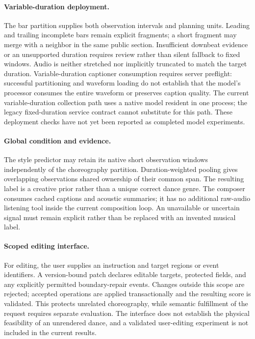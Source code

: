 \paragraph{Variable-duration deployment.}
The bar partition supplies both observation intervals and planning units.
Leading and trailing incomplete bars remain explicit fragments; a short
fragment may merge with a neighbor in the same public section.
Insufficient downbeat evidence or an unsupported duration requires
review rather than silent fallback to fixed windows. Audio is neither
stretched nor implicitly truncated to match the target duration.
Variable-duration captioner consumption requires server preflight:
successful partitioning and waveform loading do not establish that the
model's processor consumes the entire waveform or preserves caption
quality. The current variable-duration collection path uses a native
model resident in one process; the legacy fixed-duration service
contract cannot substitute for this path. These deployment checks have
not yet been reported as completed model experiments.

\paragraph{Global condition and evidence.}
The style predictor may retain its native short observation windows
independently of the choreography partition. Duration-weighted pooling
gives overlapping observations shared ownership of their common span.
The resulting label is a creative prior rather than a unique correct
dance genre. The composer consumes cached captions and acoustic
summaries; it has no additional raw-audio listening tool inside the
current composition loop. An unavailable or uncertain signal must remain
explicit rather than be replaced with an invented musical label.

\paragraph{Scoped editing interface.}
For editing, the user supplies an instruction and target regions or
event identifiers. A version-bound patch declares editable targets,
protected fields, and any explicitly permitted boundary-repair events.
Changes outside this scope are rejected; accepted operations are
applied transactionally and the resulting score is validated. This
protects unrelated choreography, while semantic fulfillment of the
request requires separate evaluation. The interface does not establish
the physical feasibility of an unrendered dance, and a validated
user-editing experiment is not included in the current results.
